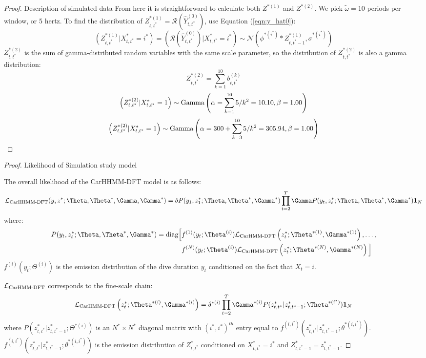 \begin{proof}{Description of simulated data}{}
From here it is straightforward to calculate both $Z^{*(1)}$ and $Z^{*(2)}$. We pick $\tilde{\omega} = 10$ periods per window, or 5 hertz. To find the distribution of $Z^{*(1)}_{t,t^*} = \mathcal{R}\left(\hat{Y}^{(0)}_{t,t^*}\right)$, use Equation (\ref{eqn:y_hat0}):
%
$$\left(Z^{*(1)}_{t,t^*} | X^*_{t,t^*} = i^* \right) = \left(\mathcal{R}\left(\hat{Y}^{(0)}_{t,t^*}\right) | X^*_{t,t^*} = i^* \right) \sim \mathcal{N} \left(\phi^{*(i^*)} * Z^{*(1)}_{t,t^*-1}, \sigma^{*(i^*)} \right)$$
%
$Z^{*(2)}_{t,t^*}$ is the sum of gamma-distributed random variables with the same scale parameter, so the distribution of $Z^{*(2)}_{t,t^*}$ is also a gamma distribution:
%
$$Z^{*(2)}_{t,t^*} = \sum_{k=1}^{10} b^{(k)}_{t,t^*}$$
$$\left(Z^{*(2)}_{t,t^*}|X^*_{t,t^*} = 1\right) \sim {\rm{Gamma}}\left(\alpha = \sum_{k=1}^{10} 5/k^2 = 10.10, \beta = 1.00 \right)$$
$$\left(Z^{*(2)}_{t,t^*}|X^*_{t,t^*} = 1\right) \sim {\rm{Gamma}}\left(\alpha = 300 + \sum_{k=3}^{10} 5/k^2 = 305.94 , \beta = 1.00 \right)$$
\end{proof}

\begin{proof}{Likelihood of Simulation study model}{}

The overall likelihood of the CarHHMM-DFT model is as follows:
%
$$\calL_{\text{CarHHMM-DFT}}(y,z^*;\Theta,\Theta^*,\Gamma,\Gamma^*) = \delta P(y_1,z_1^*;\Theta,\Theta^*,\Gamma^*) \prod_{t=2}^T \Gamma P(y_t,z_t^*;\Theta,\Theta^*,\Gamma^*) \mathbf{1}_N$$
%
where:
%
\begin{align*}
P(y_t,z_t^*;\Theta,\Theta^*,\Gamma^*)  = \text{diag}\Big[&f^{(1)}(y_t;\Theta^{(i)})\calL_{\text{CarHMM-DFT}}\left(z_t^*;\Theta^{*(1)},\Gamma^{*(1)}\right), \ldots , \\
&f^{(N)}(y_t;\Theta^{(i)})\calL_{\text{CarHMM-DFT}}\left(z_t^*;\Theta^{*(N)},\Gamma^{*(N)}\right) \Big]
\end{align*}
%
$f^{(i)}(y_t;\Theta^{(i)})$ is the emission distribution of the dive duration $y_t$ conditioned on the fact that $X_t = i$.

$\mathcal{L}_{\text{CarHMM-DFT}}$ corresponds to the fine-scale chain:
%
$$\calL_{\text{CarHMM-DFT}}\left(z_t^*;\Theta^{*(i)},\Gamma^{*(i)}\right) = \delta^{*(i)} \prod_{t=2}^T \Gamma^{*(i)} P(z^*_{t,t^*}|z^*_{t,t^*-1};\Theta^{*(i^*)}) \mathbf{1}_N$$
%
where $P(z^*_{t,t^*}|z^*_{t,t^*-1};\Theta^{*(i)})$ is an $N^* \times N^*$ diagonal matrix with $(i^*,i^*)^{th}$ entry equal to $f^{(i,i^*)}(z^*_{t,t^*}|z^*_{t,t^*-1}; \theta^{*(i,i^*)})$.
%
$f^{(i,i^*)}(z^*_{t,t^*}|z^*_{t,t^*-1}; \theta^{*(i,i^*)})$ is the emission distribution of $Z^*_{t,t^*}$ conditioned on $X^*_{t,t^*} = i^*$ and $Z^*_{t,t^*-1} = z^*_{t,t^*-1}$.

\end{proof}

